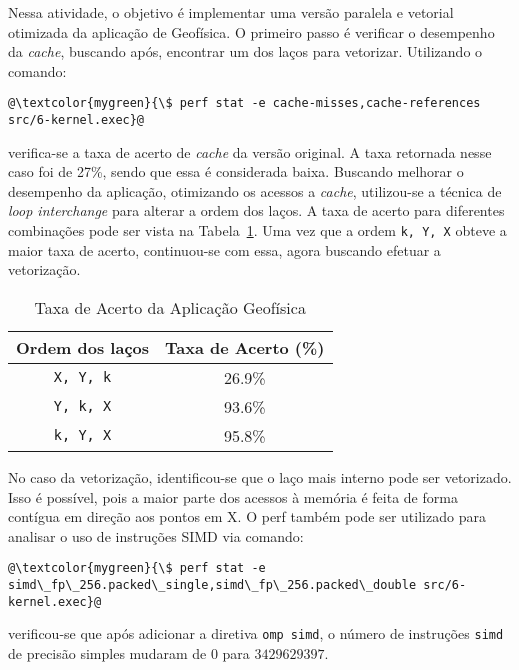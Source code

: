 Nessa atividade, o objetivo é implementar uma versão paralela e vetorial otimizada da aplicação de Geofísica. O primeiro passo é verificar o desempenho da \textit{cache}, buscando após, encontrar um dos laços para vetorizar. Utilizando o comando: 

\begin{lstlisting}[frame=none, numbers=none]
@\textcolor{mygreen}{\$ perf stat -e cache-misses,cache-references src/6-kernel.exec}@
\end{lstlisting}

verifica-se a taxa de acerto de \textit{cache} da versão original. A taxa retornada nesse caso foi de 27\%, sendo que essa é considerada baixa. Buscando melhorar o desempenho da aplicação, otimizando os acessos a \textit{cache}, utilizou-se a técnica de \textit{loop interchange} para alterar a ordem dos laços. A taxa de acerto para diferentes combinações pode ser vista na Tabela~\ref{tab:oil:cache}. Uma vez que a ordem \texttt{k, Y, X} obteve a maior taxa de acerto, continuou-se com essa, agora buscando efetuar a vetorização.

\begin{table}[!htb]
    \centering
    \caption{Taxa de Acerto da Aplicação Geofísica}
    \label{tab:oil:cache}
    \begin{tabular}{cc}
        \toprule
        Ordem dos laços     & Taxa de Acerto (\%)                 \\ \midrule
        \texttt{X, Y, k}  & 26.9\% \\
        \texttt{Y, k, X}  & 93.6\% \\
        \texttt{k, Y, X}  & 95.8\% \\ \bottomrule
    \end{tabular}
\end{table}

No caso da vetorização, identificou-se que o laço mais interno pode ser vetorizado. Isso é possível, pois a maior parte dos acessos à memória é feita de forma contígua em direção aos pontos em X. O perf também pode ser utilizado para analisar o uso de instruções SIMD via comando: 

\begin{lstlisting}[frame=none, numbers=none]
@\textcolor{mygreen}{\$ perf stat -e simd\_fp\_256.packed\_single,simd\_fp\_256.packed\_double src/6-kernel.exec}@
\end{lstlisting}

verificou-se que após adicionar a diretiva \texttt{omp simd}, o número de instruções \texttt{simd} de precisão simples mudaram de $0$ para $3 429 629 397$. 

